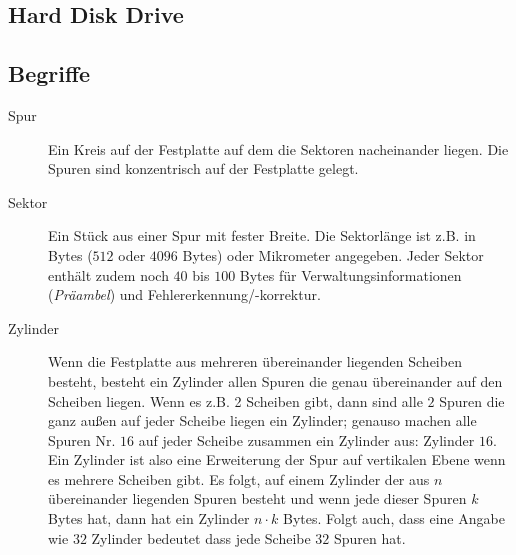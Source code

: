 \documentclass
[
	8pt,		%
	ngerman,	%
	a4paper,	%
	landscape,	%
	final		%
]{extarticle}
\begin{document}
\begin{multicols*}{4}
\section{Hard Disk Drive}
\subsection{Begriffe}
\begin{description}
	\item[Spur]
	      Ein Kreis auf der Festplatte auf dem die Sektoren nacheinander
	      liegen. Die Spuren sind konzentrisch auf der Festplatte gelegt.

	\item[Sektor]
	      Ein Stück aus einer Spur mit fester Breite. Die Sektorlänge ist
	      z.B. in Bytes ($512$ oder $4096$ Bytes) oder Mikrometer angegeben.
	      Jeder Sektor enthält zudem noch $40$ bis $100$ Bytes für
	      Verwaltungsinformationen (\emph{Präambel}) und
	      Fehlererkennung/-korrektur.

	\item[Zylinder]
	      Wenn die Festplatte aus mehreren übereinander liegenden Scheiben
	      besteht, besteht ein Zylinder allen Spuren die genau übereinander
	      auf den Scheiben liegen. Wenn es z.B. 2 Scheiben gibt, dann sind
	      alle $2$ Spuren die ganz außen auf jeder Scheibe liegen ein
	      Zylinder; genauso machen alle Spuren Nr. $16$ auf jeder Scheibe
	      zusammen ein Zylinder aus: Zylinder $16$. Ein Zylinder ist also
	      eine Erweiterung der Spur auf vertikalen Ebene wenn es mehrere
	      Scheiben gibt. Es folgt, auf einem Zylinder der aus $n$
	      übereinander liegenden Spuren besteht und wenn jede dieser Spuren
	      $k$ Bytes hat, dann hat ein Zylinder $n \cdot k$ Bytes. Folgt
	      auch, dass eine Angabe wie $32$ Zylinder bedeutet dass jede
	      Scheibe $32$ Spuren hat.
\end{description}

\end{multicols*}
\end{document}
